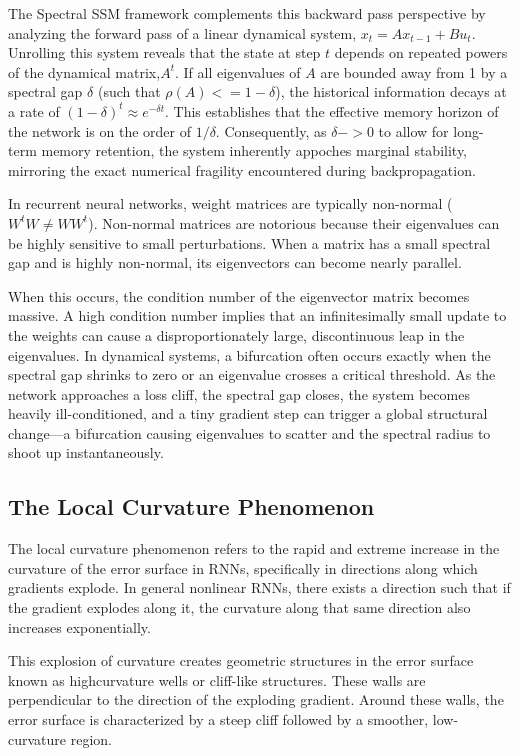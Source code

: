 \documentclass[11pt,a4paper]{article}
\begin{document}
The Spectral SSM framework complements this backward pass perspective by analyzing the forward pass of a linear dynamical system, $x_t = Ax_{t-1} +Bu_t$. Unrolling this system reveals that the state at step $t$ depends on repeated powers of the dynamical matrix,$A^t$. If all eigenvalues of $A$ are bounded away from 1 by a spectral gap $\delta$ (such that $\rho(A) <= 1 - \delta$), the historical information decays at a rate of $(1-\delta)^t \approx e^{-\delta t} $. This establishes that the effective memory horizon of the network is on the order of $1/\delta$. Consequently, as $\delta -> 0$ to allow for long-term memory retention, the system inherently appoches marginal stability, mirroring the exact numerical fragility encountered during backpropagation.

In recurrent neural networks, weight matrices are typically non-normal ($W^tW \not = WW^t$). Non-normal matrices are notorious because their eigenvalues can be highly sensitive to small perturbations. When a matrix has a small spectral gap and is highly non-normal, its eigenvectors can become nearly parallel.

When this occurs, the condition number of the eigenvector matrix becomes massive. A high condition number implies that an infinitesimally small update to the weights can cause a disproportionately large, discontinuous leap in the eigenvalues. In dynamical systems, a bifurcation often occurs exactly when the spectral gap shrinks to zero or an eigenvalue crosses a critical threshold. As the network approaches a loss cliff, the spectral gap closes, the system becomes heavily ill-conditioned, and a tiny gradient step can trigger a global structural change—a bifurcation causing eigenvalues to scatter and the spectral radius to shoot up instantaneously.

\subsection{The Local Curvature Phenomenon}
The local curvature phenomenon refers to the rapid and extreme increase in the curvature of the error surface in RNNs, specifically in directions along which gradients explode. In general nonlinear RNNs, there exists a direction such that if the gradient explodes along it, the curvature along that same direction also increases exponentially. 

This explosion of curvature creates geometric structures in the error surface known as highcurvature wells or cliff-like structures. These walls are perpendicular to the direction of the exploding gradient. Around these walls, the error surface is characterized by a steep cliff followed by a smoother, low-curvature region.
\end{document}
